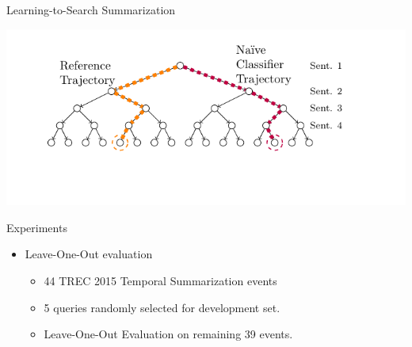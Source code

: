 \begin{frame}{Learning-to-Search Summarization}
\begin{center}
{\includegraphics[scale=.7]{2_feature_based_models_of_salience/image_texs/l2s2/l2s2.pdf}}
\end{center}
\end{frame}



\begin{frame}{Experiments}

    \begin{itemize}
    \item Leave-One-Out evaluation
        \begin{itemize}
            \item 44 TREC 2015 Temporal Summarization events
            \item 5 queries randomly selected for development set.
            \item Leave-One-Out Evaluation on remaining 39 events.
        \end{itemize}
    \end{itemize}


\end{frame}

